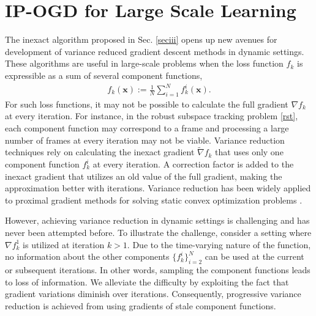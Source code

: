 \documentclass[draftcls,onecolumn,12pt]{IEEEtran}
\theoremstyle{plain}
\def\x{\mathbf{x}}
\def \nt {\tilde{\nabla}}
\theoremstyle{plain}
\theoremstyle{remark}
\begin{document}

\section{IP-OGD for Large Scale Learning}\label{vrsec} 
The inexact algorithm proposed in Sec. \ref{seciii} opens up new avenues for development of variance reduced gradient descent methods in dynamic settings. These algorithms are useful in large-scale problems when the loss function $f_k$ is expressible as a sum of several component functions, 
\begin{align}\label{large_Scale}
 f_k(\x):=\frac{1}{N}\sum_{i=1}^{N}f_k^i(\x).
\end{align} 
For such loss functions, it may not be possible to calculate the full gradient $\nabla f_k$ at every iteration. For instance, in the robust subspace tracking problem \eqref{rst}, each component function may correspond to a frame and processing a large number of frames at every iteration may not be viable. Variance reduction techniques rely on calculating the inexact gradient $\nt f_k$ that uses only one component function $f_k^i$ at every iteration. A correction factor is added to the inexact gradient that utilizes an old value of the full gradient, making the approximation better with iterations. Variance reduction has been widely applied to proximal gradient methods for solving static convex optimization problems \cite{xiao2014proximal,meng2017asynchronous}. 

However, achieving variance reduction in dynamic settings is challenging and has never been attempted before. To illustrate the challenge, consider a setting where $\nabla f_k^1$ is utilized at iteration $k > 1$. Due to the time-varying nature of the function, no information about the other components $\{f_k^i\}_{i=2}^N$ can be used at the current or subsequent iterations. In other words, sampling the component functions leads to loss of information. We alleviate the difficulty by exploiting the fact that gradient variations diminish over iterations. Consequently, progressive variance reduction is achieved from using gradients of stale component functions. 
\end{document}
